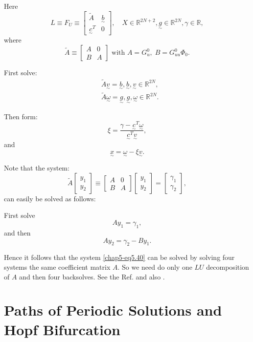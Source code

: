 Here
$$
L \equiv F_U \equiv 
\begin{bmatrix} 
\tilde{A} & \underset{\sim}{b}  \\
 \underset{\sim}{c}^T & 0 
\end{bmatrix},  \quad 
X \in
\mathbb{R}^{2N+2},\underset{\sim}{g} \in \mathbb{R}^{2N},
\gamma \in \mathbb{R},  
$$
where   
$$
\tilde{A} \equiv 
\begin{bmatrix}
 A & 0\\ 
B & A 
\end{bmatrix} \text{  with } A=  G^0_u, \; B= G^0_{uu} \Phi_0. 
$$

First solve:
\begin{align*} 
& \tilde{A} \underset{\sim}{v}= \underset{\sim}{b},\underset{\sim}{b},
\underset{\sim}{v} \in \mathbb{R}^{2N},\\ 
& \tilde{A} \underset{\sim}{\omega}=
\underset{\sim}{g},\underset{\sim}{g}, \underset{\sim}{\omega}
\in \mathbb{R}^{2N}. 
\end{align*}\pageoriginale

Then form:
$$
\xi = \frac{\gamma-\underset{\sim}{c}^T 
  \underset{\sim}{\omega}}{\underset{\sim}{c}^T \underset{\sim}{v}},  
$$
and 
$$
\underset{\sim}{x} =\underset{\sim}{\omega}- \xi \underset{\sim}{v}.
$$
 
 Note that the system:
 $$
  \tilde{A} \begin{bmatrix}y_1 \\ y_2 \end{bmatrix}
  \equiv \begin{bmatrix}A & 0 \\ B & A \end{bmatrix} \begin{bmatrix}
    y_1 \\y_2 \end{bmatrix} = \begin{bmatrix} \gamma_1
    \\ \gamma_2 \end{bmatrix}, 
 $$
 can easily be solved as follows:
 
 First solve
 $$
  Ay_1 = \gamma_1,
 $$
 and then 
 $$
 Ay_2 = \gamma_2 -By_1.
 $$
 
 Hence it follows that the system \eqref{chap5-eq5.40} can be solved
 by solving  four systems the same coefficient matrix $A$. So we need
 do only one 
 $LU$ decomposition of $A$ and then four backsolves. See the
 Ref. \cite{key33} and also \cite{key15}. 
 
\setcounter{section}{40}
\section{Paths of Periodic Solutions and Hopf
  Bifurcation}\label{chap5-sec5.41}\pageoriginale%
 
